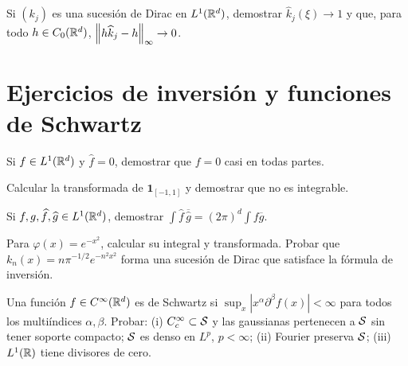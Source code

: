 \begin{ejercicio}\label{ej:v4-l10-3}
Si $(k_j)$ es una sucesión de Dirac en $L^1(\mathbb R^d)$, demostrar $\widehat k_j(\xi)\to1$ y que, para todo $h\in C_0(\mathbb R^d)$, $\left\lVert h\widehat k_j-h\right\rVert_\infty\to0$.
\end{ejercicio}


\section{Ejercicios de inversión y funciones de Schwartz}
\begin{ejercicio}\label{ej:v4-l11-1}
Si $f\in L^1(\mathbb R^d)$ y $\widehat f=0$, demostrar que $f=0$ casi en todas partes.
\end{ejercicio}

\begin{ejercicio}\label{ej:v4-l11-2}
Calcular la transformada de $\mathbf1_{[-1,1]}$ y demostrar que no es integrable.
\end{ejercicio}

\begin{ejercicio}\label{ej:v4-l11-3}
Si $f,g,\widehat f,\widehat g\in L^1(\mathbb R^d)$, demostrar
$\int\widehat f\,\overline{\widehat g}=(2\pi)^d\int f\overline g$.
\end{ejercicio}

\begin{ejercicio}\label{ej:v4-l11-4}
Para $\varphi(x)=e^{-x^2}$, calcular su integral y transformada. Probar que $k_n(x)=n\pi^{-1/2}e^{-n^2x^2}$ forma una sucesión de Dirac que satisface la fórmula de inversión.
\end{ejercicio}

\begin{ejercicio}\label{ej:v4-l11-5}
Una función $f\in C^\infty(\mathbb R^d)$ es de Schwartz si $\sup_x|x^\alpha\partial^\beta f(x)|<\infty$ para todos los multiíndices $\alpha,\beta$. Probar: (i) $C_c^\infty\subset\mathcal S$ y las gaussianas pertenecen a $\mathcal S$ sin tener soporte compacto; $\mathcal S$ es denso en $L^p$, $p<\infty$; (ii) Fourier preserva $\mathcal S$; (iii) $L^1(\mathbb R)$ tiene divisores de cero.
\end{ejercicio}


